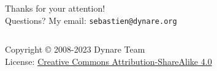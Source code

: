 \documentclass[aspectratio=169]{beamer}
\begin{document}
\begin{frame}
  \begin{center}
    \vfill {\LARGE Thanks for your attention! \\
    Questions?}
    \vfill
    {\LARGE My email: \texttt{sebastien@dynare.org}}
    \vfill
  \end{center}
  \vfill
  \begin{columns}[T]

    \ccbysa
    \tiny
    Copyright © 2008-2023 Dynare Team \\
    License: \href{http://creativecommons.org/licenses/by-sa/4.0/}{Creative
      Commons Attribution-ShareAlike 4.0}
  \end{columns}
\end{frame}
\end{document}
